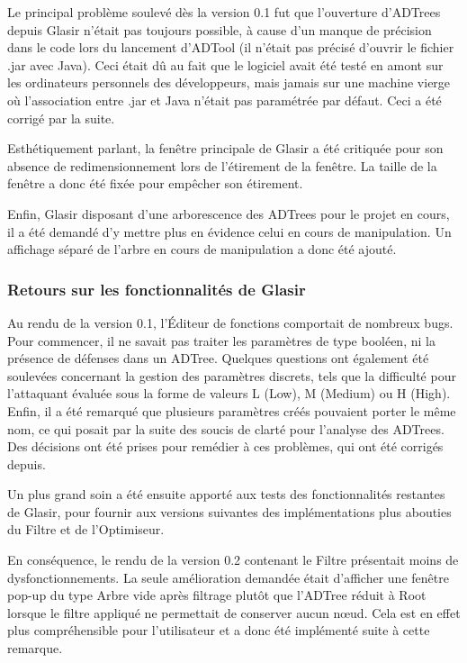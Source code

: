 Le principal problème soulevé dès la version 0.1 fut que l'ouverture d'ADTrees depuis Glasir n'était pas toujours possible, à cause d'un manque de précision dans le code lors du lancement d'ADTool (il n'était pas précisé d'ouvrir le fichier .jar avec Java). Ceci était dû au fait que le logiciel avait été testé en amont sur les ordinateurs personnels des développeurs, mais jamais sur une machine vierge où l'association entre .jar et Java n'était pas paramétrée par défaut. Ceci a été corrigé par la suite. 

Esthétiquement parlant, la fenêtre principale de Glasir a été critiquée pour son absence de redimensionnement lors de l'étirement de la fenêtre. La taille de la fenêtre a donc été fixée pour empêcher son étirement. 

Enfin, Glasir disposant d'une arborescence des ADTrees pour le projet en cours, il a été demandé d'y mettre plus en évidence celui en cours de manipulation. Un affichage séparé 
de l'arbre en cours de manipulation a donc été ajouté.

\subsubsection{Retours sur les fonctionnalités de Glasir}
\label{subsubsec:Glasir}

Au rendu de la version 0.1, l'Éditeur de fonctions comportait de nombreux bugs. Pour commencer, il ne savait pas traiter les paramètres de type booléen, ni la présence de défenses dans un ADTree. Quelques questions ont également été soulevées concernant la gestion des paramètres discrets, tels que la difficulté pour l'attaquant évaluée sous la forme de valeurs L (Low), M (Medium) ou H (High). Enfin, il a été remarqué que plusieurs paramètres créés pouvaient porter le même nom, ce qui posait par la suite des soucis de clarté pour l'analyse des ADTrees. Des décisions ont été prises pour remédier à ces problèmes, qui ont été corrigés depuis. 

Un plus grand soin a été ensuite apporté aux tests des fonctionnalités restantes de Glasir, pour fournir aux versions suivantes des implémentations plus abouties du Filtre et de l'Optimiseur. 

En conséquence, le rendu de la version 0.2 contenant le Filtre présentait moins de dysfonctionnements. La seule amélioration demandée était d'afficher une fenêtre pop-up du type \og Arbre vide après filtrage \fg{} plutôt que l'ADTree réduit à \og Root \fg{} lorsque le filtre appliqué ne permettait de conserver aucun n\oe{}ud. Cela est en effet plus compréhensible pour l'utilisateur et a donc été implémenté suite à cette remarque.

